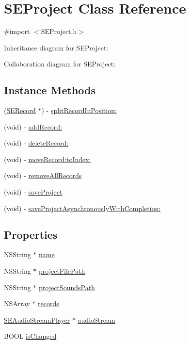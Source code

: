 \hypertarget{interface_s_e_project}{\section{S\-E\-Project Class Reference}
\label{interface_s_e_project}
}


{\ttfamily \#import $<$S\-E\-Project.\-h$>$}



Inheritance diagram for S\-E\-Project\-:


Collaboration diagram for S\-E\-Project\-:
\subsection*{Instance Methods}
\begin{DoxyCompactItemize}
\item 
(\hyperlink{interface_s_e_record}{S\-E\-Record} $\ast$) -\/ \hyperlink{interface_s_e_project_adb4519610c7481bf048f235189ff737c}{split\-Record\-In\-Position\-:}
\item 
(void) -\/ \hyperlink{interface_s_e_project_a215f3b65a6214364b1c91a3e868e326f}{add\-Record\-:}
\item 
(void) -\/ \hyperlink{interface_s_e_project_a766d033976c34b25c714664a936431c0}{delete\-Record\-:}
\item 
(void) -\/ \hyperlink{interface_s_e_project_a6df677b3addadd2b57c7cb476817b3f0}{move\-Record\-:to\-Index\-:}
\item 
(void) -\/ \hyperlink{interface_s_e_project_adf1f53d931f669b12dfbabf92e3e90a4}{remove\-All\-Records}
\item 
(void) -\/ \hyperlink{interface_s_e_project_ad0dc83a89c70e8a670d2e0eb0381e632}{save\-Project}
\item 
(void) -\/ \hyperlink{interface_s_e_project_a996a39778f2d176ecf7ffda117703f6c}{save\-Project\-Asynchronously\-With\-Completion\-:}
\end{DoxyCompactItemize}
\subsection*{Properties}
\begin{DoxyCompactItemize}
\item 
N\-S\-String $\ast$ \hyperlink{interface_s_e_project_adf05552fc2cf324eb3511d3bd1b8a996}{name}
\item 
N\-S\-String $\ast$ \hyperlink{interface_s_e_project_a2d54ed4720974d226ab30b8d32ef21dd}{project\-File\-Path}
\item 
N\-S\-String $\ast$ \hyperlink{interface_s_e_project_a59726fcb927ff059c83a1ac7b252db0d}{project\-Sounds\-Path}
\item 
N\-S\-Array $\ast$ \hyperlink{interface_s_e_project_ac1f0c37f5832b2ba24ac9bf65f0fdcce}{records}
\item 
\hyperlink{interface_s_e_audio_stream_player}{S\-E\-Audio\-Stream\-Player} $\ast$ \hyperlink{interface_s_e_project_af35059bb818d498c8a96053818016a26}{audio\-Stream}
\item 
B\-O\-O\-L \hyperlink{interface_s_e_project_a4da84c0c1ef729881956646b15762cc9}{is\-Changed}
\end{DoxyCompactItemize}


